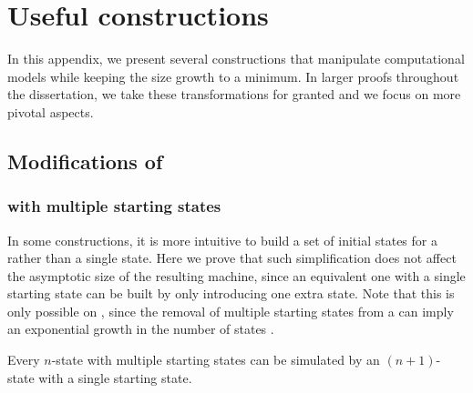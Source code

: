 \chapter{Useful constructions}\label{app:constructions}
In this appendix, we present several constructions that manipulate computational models while keeping the size growth to a minimum.
In larger proofs throughout the dissertation, we take these transformations for granted and we focus on more pivotal aspects.



\section{Modifications of \texorpdfstring{\ONFAs}{1NFAs}}


\subsection{\texorpdfstring{\ONFAs}{1NFAs} with multiple starting states}\label{sub:multistart}
In some constructions, it is more intuitive to build a set of initial states for a \ONFA rather than a single state.
Here we prove that such simplification does not affect the asymptotic size of the resulting machine, since an equivalent one with a single starting state can be built by only introducing one extra state.
Note that this is only possible on \ONFAs, since the removal of multiple starting states from a \ODFA can imply an exponential growth in the number of states \cite{HolSal+01}.
\begin{thrm}\label{thm:mult-start-states}
	Every $n$-state \ONFA with multiple starting states can be simulated by an $(n+1)$-state \ONFA with a single starting state.
\end{thrm}
